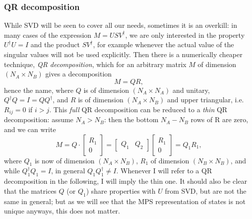 \documentclass[a4paper,10pt,oneside,onecolumn,1p,times]{elsarticle}
\begin{document}
\subsubsection{QR decomposition}
While SVD will be seen to cover all our needs, sometimes it is an overkill: in many cases of the expression $M=USV^\dagger$, we are only interested in the property $U^\dagger U = I$ and the product $SV^\dagger$, for example whenever the actual value of the singular values will not be used explicitly. Then there is a numerically cheaper technique, {\em QR decomposition}, which for an arbitrary matrix $M$ of dimension $(N_A \times N_B)$ gives a decomposition
\begin{equation}
M = QR ,
\label{eq:QRdecomposition}
\end{equation}
hence the name, where $Q$ is of dimension $(N_A \times N_A)$ and unitary, $Q^\dagger Q = I = Q Q^\dagger$, and $R$ is of dimension $(N_A \times N_B)$ and upper triangular, i.e. $R_{ij}=0$ if $i>j$. This {\em full} QR decomposition can be reduced to a {\em thin} QR decomposition: assume $N_A > N_B$: then the bottom $N_A-N_B$ rows of R are zero, and we can write
\begin{equation}
M=Q \cdot \left[ \begin{array}{c} R_1 \\ 0 \end{array} \right] = \left[ \begin{array}{cc} Q_1 & Q_2 \end{array} \right] \left[ \begin{array}{c} R_1 \\ 0 \end{array} \right] = Q_1 R_1 ,
\label{eq:thinQRdecomposition}
\end{equation}
where $Q_1$ is now of dimension $(N_A \times N_B)$, $R_1$ of dimension $(N_B \times N_B)$, and while $Q_1^\dagger Q_1 = I$, in general $Q_1 Q_1^\dagger \neq I$. Whenever I will refer to a QR decomposition in the following, I will imply the thin one. It should also be clear that the matrices $Q$ (or $Q_1$) share properties with $U$ from SVD, but are not the same in general; but as we will see that the MPS representation of states is not unique anyways, this does not matter.
\end{document}
